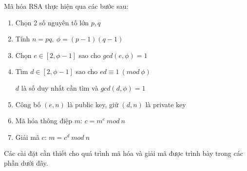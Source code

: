 Mã hóa RSA thực hiện qua các bước sau:

\begin{enumerate}[ \indent{(}1{)} ]
        \item Chọn 2 số nguyên tố lớn $p,q$
        \item Tính $n=pq,\ \phi= (p-1)(q-1)$
        \item Chọn $e\in[2, \phi - 1]$ sao cho $gcd(e, \phi) = 1$
        \item Tìm $d \in [2, \phi - 1]$ sao cho $ed \equiv 1\ (mod\ \phi)$

        $d$ là số duy nhất cần tìm và $gcd(d,\phi)=1$
        \item Công bố $(e, n)$ là public key, giữ $(d, n)$ là private key
        \item Mã hóa thông điệp $m$: $c = m^e\ mod\ n$
        \item Giải mã $c$: $m = c^d\ mod\ n$
\end{enumerate}
Các cài đặt cần thiết cho quá trình mã hóa và giải mã được trình bày trong các phần dưới đây.